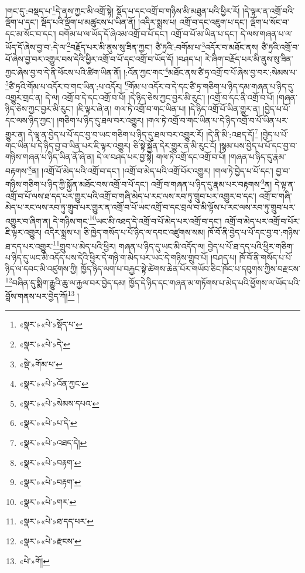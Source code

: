།གང་དུ་:བསྡད་པ་\footnote{«སྣར་»«པེ་»སྡོད་པ་}དེ་ནས་ཀྱང་མི་འགྲོ་སྟེ། སྡོད་པ་དང་འགྲོ་བ་གཉིས་མི་མཐུན་པའི་ཕྱིར་རོ། །དེ་ལྟར་ན་འགྲོ་བའི་ལྡོག་པ་དང་། སྡོད་པའི་ལྡོག་པ་མཚུངས་པ་ཡིན་ནོ། །འདིར་སྨྲས་པ། འགྲོ་བ་དང་འཇུག་པ་དང་། ལྡོག་པ་སོང་བ་དང་མ་སོང་བ་དང་། བགོམ་པ་ལ་ཡོད་དོ་ཞེའམ་འགྲོ་བ་པོ་དང་། འགྲོ་བ་པོ་མ་ཡིན་པ་དང་། དེ་ལས་གཞན་པ་ལ་ཡོད་དོ་ཞེས་བྱ་བ་:དེ་ལ་\footnote{«སྣར་»«པེ་»དེ་}བརྗོད་པར་མི་ནུས་སུ་ཟིན་ཀྱང་། ཙཻ་ཏྲའི་:བགོམ་པ་\footnote{«སྡེ་»གོམ་པ་}འདོར་བ་མཐོང་ནས། ཙཻ་ཏྲའི་འགྲོ་བ་པོ་ཞེས་བྱ་བར་འགྱུར་བས་དེའི་ཕྱིར་འགྲོ་བ་པོ་དང་འགྲོ་བ་ཡོད་དོ། །བཤད་པ། རེ་ཞིག་བརྗོད་པར་མི་ནུས་སུ་ཟིན་ཀྱང་ཞེས་བྱ་བ་དེ་ནི་ཕོངས་པའི་ཚིག་ཡིན་ནོ། །:འོན་ཀྱང་གང་\footnote{«སྣར་»«པེ་»འོན་ཀྱང་}མཐོང་ནས་ཙཻ་ཏྲ་འགྲོ་བ་པོ་ཞེས་བྱ་བར་:སེམས་པ་\footnote{«སྣར་»«པེ་»སེམས་དཔའ་}ཙཻ་ཏྲའི་གོམ་པ་འདོར་བ་གང་ཡིན་:པ་འདོར། \footnote{«སྣར་»«པེ་»པ་དེ་}གོམ་པ་འདོར་བ་དེ་དང་ཙཻ་ཏྲ་གཅིག་པ་ཉིད་དམ་གཞན་པ་ཉིད་དུ་འགྱུར་གྲང་ན། དེ་ལ། འགྲོ་བ་དེ་དང་འགྲོ་བ་པོ། །དེ་ཉིད་ཅེས་ཀྱང་བྱར་མི་རུང་། །འགྲོ་བ་དང་ནི་འགྲོ་བ་པོ། །གཞན་ཉིད་ཅེས་ཀྱང་བྱར་མི་རུང་། །ཇི་ལྟར་ཞེ་ན། གལ་ཏེ་འགྲོ་བ་གང་ཡིན་པ། །དེ་ཉིད་འགྲོ་པོ་ཡིན་གྱུར་ན། །བྱེད་པ་པོ་དང་ལས་ཉིད་ཀྱང་། །གཅིག་པ་ཉིད་དུ་ཐལ་བར་འགྱུར། །གལ་ཏེ་འགྲོ་བ་གང་ཡིན་པ་དེ་ཉིད་འགྲོ་བ་པོ་ཡིན་པར་གྱུར་ན། དེ་ལྟ་ན་བྱེད་པ་པོ་དང་བྱ་བ་ཡང་གཅིག་པ་ཉིད་དུ་ཐལ་བར་འགྱུར་རོ། །དེ་ནི་མི་:འཐད་དོ།\footnote{«སྣར་»«པེ་»འཐད་དེ།} །བྱེད་པ་པོ་གང་ཡིན་པ་དེ་ཉིད་བྱ་བ་ཡིན་པར་ཇི་ལྟར་འགྱུར། ཅི་སྟེ་སྐྱོན་དེར་གྱུར་ན་མི་རུང་ངོ། །སྙམ་པས་བྱེད་པ་པོ་དང་བྱ་བ་གཉིས་གཞན་པ་ཉིད་ཡིན་ནོ་ཞེ་ན། དེ་ལ་བཤད་པར་བྱ་སྟེ། གལ་ཏེ་འགྲོ་དང་འགྲོ་བ་པོ། །གཞན་པ་ཉིད་དུ་རྣམ་བརྟགས་\footnote{«སྣར་»«པེ་»བརྟག་}ན། །འགྲོ་པོ་མེད་པའི་འགྲོ་བ་དང་། །འགྲོ་བ་མེད་པའི་འགྲོ་པོར་འགྱུར། །གལ་ཏེ་བྱེད་པ་པོ་དང་། བྱ་བ་གཉིས་གཅིག་པ་ཉིད་ཀྱི་སྐྱོན་མཐོང་བས་འགྲོ་བ་པོ་དང་། འགྲོ་བ་གཞན་པ་ཉིད་དུ་རྣམ་པར་བརྟགས་\footnote{«སྣར་»«པེ་»བརྟག་}ན། དེ་ལྟ་ན་འགྲོ་བ་པོ་ལས་ཐ་དད་པར་གྱུར་པའི་འགྲོ་བ་གཞི་མེད་པ་རང་ལས་རབ་ཏུ་གྲུབ་པར་འགྱུར་བ་དང་། འགྲོ་བ་གཞི་མེད་པ་རང་ལས་རབ་ཏུ་གྲུབ་པར་གྱུར་ན་འགྲོ་བ་པོ་ཡང་འགྲོ་བ་དང་བྲལ་བ་མི་ལྟོས་པ་རང་ལས་རབ་ཏུ་གྲུབ་པར་འགྱུར་བ་ཞིག་ན། དེ་གཉིས་གང་\footnote{«སྣར་»«པེ་»གར་}ཡང་མི་འཐད་དེ་འགྲོ་བ་པོ་མེད་པར་འགྲོ་བ་དང་། འགྲོ་བ་མེད་པར་འགྲོ་བ་པོར་ཇི་ལྟར་འགྱུར། འདིར་སྨྲས་པ། ཅི་ཁྱེད་གསོད་པ་པོ་ཉིད་ལ་དབང་འཛུགས་སམ། ཁོ་བོ་ནི་བྱེད་པ་པོ་དང་བྱ་བ་:གཉིས་ཐ་དད་པར་འགྱུར་\footnote{«སྣར་»«པེ་»ཐ་དད་པར་}གྲུབ་པ་མེད་པའི་ཕྱིར། གཞན་པ་ཉིད་དུ་ཡང་མི་འདོད་ལ། བྱེད་པ་པོ་ཐ་དད་པའི་ཕྱིར་གཅིག་པ་ཉིད་དུ་ཡང་མི་འདོད་པས་དེའི་ཕྱིར་དེ་གཉི་ག་མེད་པར་ཡང་དེ་གཉིས་གྲུབ་པོ། །བཤད་པ། ཁོ་བོ་ནི་གསོད་པ་པོ་ཉིད་ལ་དབང་མི་འཛུགས་ཀྱི། ཁྱོད་ཉིད་ལག་པ་བརྐྱང་སྟེ་ཚེགས་ཆེན་པོར་གཡོབ་ཅིང་ཁོང་པ་དབུགས་ཀྱིས་བརྫངས་\footnote{«སྣར་»«པེ་»རྫངས་}བཞིན་དུ་སྨིག་རྒྱུའི་ཆུ་ལ་རྐྱལ་བར་བྱེད་དམ། ཁྱོད་དེ་ཉིད་དང་གཞན་མ་གཏོགས་པ་མེད་པའི་ཕྱོགས་ལ་ཡོད་པའི་བློས་གནས་པར་བྱེད་ཀོ།\footnote{«པེ་»གོ།} །
